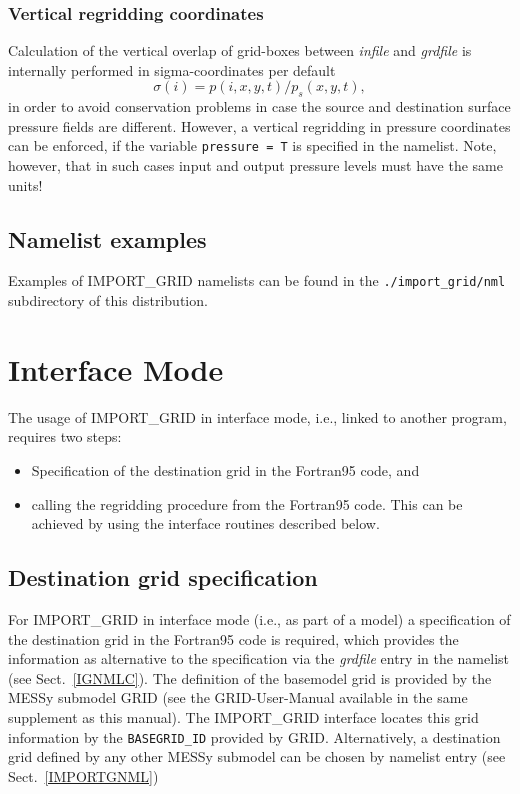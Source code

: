 \documentclass[11pt,twoside]{report}
\begin{document}
\subsubsection{Vertical regridding coordinates}
Calculation of the vertical overlap of grid-boxes between {\it infile} and {\it grdfile} is internally
performed in sigma-coordinates per default
\begin{equation}
\sigma(i) = p(i, x, y, t)/p_s (x, y, t) ,
\end{equation}
in order to avoid conservation problems in case the source and destination surface
pressure fields are different. However, a vertical regridding in pressure coordinates
can be enforced, if the variable \verb|pressure = T| is specified in the namelist. Note,
however, that in such cases input and output pressure levels must have the same
units!

\subsection{Namelist examples \label{IGNML}}
Examples of IMPORT\_GRID namelists can be found in the
\verb|./import_grid/nml| subdirectory of this distribution.

\section{Interface Mode\label{IGinterface}}
The usage of IMPORT\_GRID in interface mode, i.e., linked to another program, requires
two steps:
\begin{itemize}
\item Specification of the destination grid in the Fortran95 code, and
\item calling the regridding procedure from the Fortran95 code. This can be 
achieved by using the interface routines described below.
\end{itemize}

\subsection{Destination grid specification}
For IMPORT\_GRID in interface mode (i.e., as part of a model) a specification of the
destination grid in the Fortran95 code is required, which provides the information as
alternative to the specification via the {\it grdfile} entry in the namelist 
(see Sect.~\ref{IGNMLC}).
The definition of the basemodel grid is provided by the MESSy submodel GRID 
(see the GRID-User-Manual available in the same supplement as this manual).
 The IMPORT\_GRID interface locates this grid information by the 
\verb|BASEGRID_ID| provided by GRID.
Alternatively, a destination grid defined by any other MESSy submodel can be 
chosen by namelist entry (see Sect.~\ref{IMPORTGNML})
\end{document}
